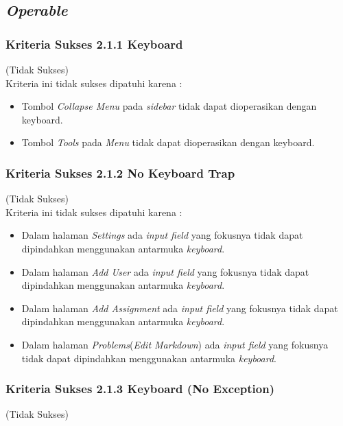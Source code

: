 \subsection{\textit{Operable}}
\label{subsec:kepatuhan_operable}

\subsubsection{Kriteria Sukses 2.1.1 Keyboard}
\label{subsubsec:kepatuhan_kriteria_2.1.1}
(Tidak Sukses) \\

Kriteria ini tidak sukses dipatuhi karena :
\begin{itemize}
	\item Tombol \textit{Collapse Menu} pada \textit{sidebar} tidak dapat dioperasikan dengan keyboard.
	\item Tombol \textit{Tools} pada \textit{Menu} tidak dapat dioperasikan dengan keyboard.
\end{itemize}

\subsubsection{Kriteria Sukses 2.1.2 No Keyboard Trap}
\label{subsubsec:kepatuhan_kriteria_2.1.2}
(Tidak Sukses) \\

Kriteria ini tidak sukses dipatuhi karena :
\begin{itemize}
	\item Dalam halaman \textit{Settings} ada \textit{input field} yang fokusnya tidak dapat dipindahkan menggunakan antarmuka \textit{keyboard}.
	\item Dalam halaman \textit{Add User} ada \textit{input field} yang fokusnya tidak dapat dipindahkan menggunakan antarmuka \textit{keyboard}.
	\item Dalam halaman \textit{Add Assignment} ada \textit{input field} yang fokusnya tidak dapat dipindahkan menggunakan antarmuka \textit{keyboard}.
	\item Dalam halaman \textit{Problems}(\textit{Edit Markdown}) ada \textit{input field} yang fokusnya tidak dapat dipindahkan menggunakan antarmuka \textit{keyboard}.
\end{itemize}

\subsubsection{Kriteria Sukses 2.1.3 Keyboard (No Exception)}
\label{subsubsec:kepatuhan_kriteria_2.1.3}
(Tidak Sukses) \\

